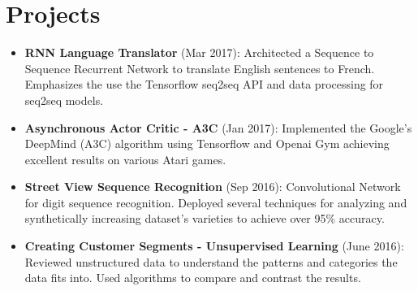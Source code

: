 \documentclass[9pt, a4paper, oneside, final]{scrartcl} %
\begin{document}

\section{Projects}

\begin{itemize}\itemsep2pt \parskip1.5pt 
\item \textbf{RNN Language Translator} (Mar 2017): Architected a Sequence to Sequence Recurrent Network to translate English sentences to French. Emphasizes the use the Tensorflow seq2seq API and data processing for seq2seq models.

\item \textbf{Asynchronous Actor Critic - A3C} (Jan 2017): Implemented the Google's DeepMind (A3C) algorithm using Tensorflow and Openai Gym achieving excellent results on various Atari games.

\item \textbf{Street View Sequence Recognition} (Sep 2016): Convolutional Network for digit sequence recognition. Deployed several techniques for analyzing and synthetically increasing dataset's varieties to achieve over 95\% accuracy.

\item \textbf{Creating Customer Segments - Unsupervised Learning} (June 2016): Reviewed unstructured data to understand the patterns and categories the data fits into.
Used algorithms to compare and contrast the results.
\end{itemize}
\end{document}
